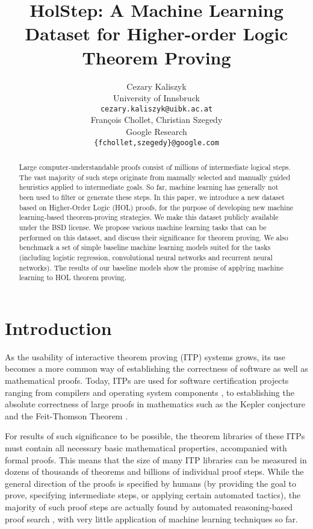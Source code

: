 \documentclass[]{article}
\title{HolStep: A Machine Learning Dataset for Higher-order Logic Theorem Proving}
\author{Cezary Kaliszyk\\
University of Innsbruck\\
\texttt{cezary.kaliszyk@uibk.ac.at} \\
\And
Fran\c{c}ois Chollet, Christian Szegedy\\
Google Research\\
\texttt{\{fchollet,szegedy\}@google.com}
}
\date{}
\begin{document}
\maketitle
\begin{abstract}
Large computer-understandable proofs consist of millions of intermediate
logical steps. The vast majority of such steps originate from manually
selected and manually guided heuristics applied to intermediate goals.
So far, machine learning has generally not been used to filter or
generate these steps. In this paper, we introduce a new dataset based on
Higher-Order Logic (HOL) proofs, for the purpose of developing new
machine learning-based theorem-proving strategies. We make this dataset
publicly available under the BSD license. We propose various machine
learning tasks that can be performed on this dataset, and discuss their
significance for theorem proving. We also benchmark a set of simple baseline
machine learning models suited for the tasks (including logistic regression,
convolutional neural networks and recurrent neural networks). The results of our
baseline models show the promise of applying machine learning to HOL
theorem proving.
\end{abstract}

\section{Introduction}\label{s:intro}



As the usability of interactive theorem proving (ITP) systems
\citep{itp} grows, its use becomes a more common way of establishing the
correctness of software as well as mathematical proofs. Today, ITPs are used
for software certification projects ranging from compilers
\citep{compcert} and operating system components
\citep{fscq,sel4}, to establishing the absolute correctness of
large proofs in mathematics such as the Kepler conjecture
\citep{flyspeckfinal} and the Feit-Thomson Theorem \citep{oddorder}.

For results of such significance to be possible, the theorem libraries
of these ITPs must contain all necessary basic mathematical properties,
accompanied with formal proofs. This means that the size of many ITP
libraries can be measured in dozens of thousands of theorems
\citep{mizarnut,afp} and billions of individual proof steps.
While the general direction of the proofs is specified by humans (by
providing the goal to prove, specifying intermediate steps, or applying
certain automated tactics), the majority of such proof steps are
actually found by automated reasoning-based proof search \citep{lemmas},
with very little application of machine learning techniques so far.
\end{document}
